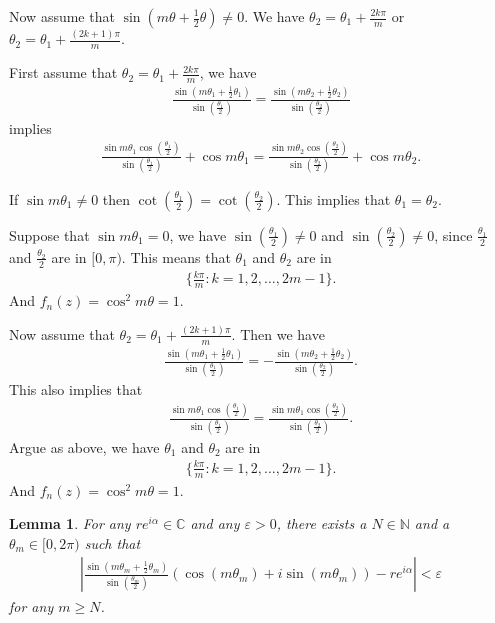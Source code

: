 \documentclass[a4paper,10pt]{amsart}
\newtheorem{lemma}{Lemma}[section]
\newcommand{\C}{\mathbb C} %
\newcommand{\N}{\mathbb N} %
\begin{document}
Now assume that $\sin (m\theta + \frac{1}{2}\theta) \neq 0$.
We have $\theta_2 = \theta_1 + \frac{2k\pi}{m}$ or
$\theta_2 = \theta_1 + \frac{(2k+1)\pi}{m}$.

First assume that $\theta_2 = \theta_1 + \frac{2k\pi}{m}$, we have
\begin{align*}
    \frac{\sin (m\theta_1 + \frac{1}{2}\theta_1)}
       {\sin (\frac{\theta_1}{2})} =
    \frac{\sin (m\theta_2 + \frac{1}{2}\theta_2)}
       {\sin (\frac{\theta_2}{2})}
\end{align*}
implies
\begin{align*}
    \frac{\sin m\theta_1 \cos (\frac{\theta_1}{2})}
    {\sin (\frac{\theta_1}{2})} + \cos m\theta_1  
    =
    \frac{\sin m\theta_2 \cos (\frac{\theta_2}{2})}
    {\sin (\frac{\theta_2}{2})} + \cos m\theta_2 . 
\end{align*}

If $\sin m\theta_1 \neq 0$ then $\cot (\frac{\theta_1}{2}) = 
\cot (\frac{\theta_2}{2})$. This implies that $\theta_1 = \theta_2$. 

Suppose that $\sin m\theta_1 = 0$, we have 
$\sin (\frac{\theta_1}{2}) \neq 0$ and $\sin (\frac{\theta_2}{2}) \neq 0$,
since $\frac{\theta_1}{2}$ and $\frac{\theta_2}{2}$ are in $[0, \pi)$.
This means that $\theta_1$ and $\theta_2$ are in 
\begin{align*}
    \{\frac{k\pi}{m} : k = 1, 2, \ldots, 2m-1 \}.
\end{align*}
And $f_n(z) = \cos^{2} m\theta = 1$.

Now assume that $\theta_2 = \theta_1 + \frac{(2k+1)\pi}{m}$. Then we have
\begin{align*}
    \frac{\sin (m\theta_1 + \frac{1}{2}\theta_1)}
       {\sin (\frac{\theta_1}{2})} =
    -\frac{\sin (m\theta_2 + \frac{1}{2}\theta_2)}
       {\sin (\frac{\theta_2}{2})}.
\end{align*}
This also implies that
\begin{align*}
    \frac{\sin m\theta_1 \cos (\frac{\theta_1}{2})}
    {\sin (\frac{\theta_1}{2})} 
    =
    \frac{\sin m\theta_1 \cos (\frac{\theta_2}{2})}
    {\sin (\frac{\theta_2}{2})}. 
\end{align*}
Argue as above, we have $\theta_1$ and $\theta_2$ are in 
\begin{align*}
    \{\frac{k\pi}{m} : k = 1, 2, \ldots, 2m-1 \}.
\end{align*}
And $f_n(z) = \cos^{2} m\theta = 1$.   

\begin{lemma}
    For any $re^{i\alpha} \in \C$ and any $\varepsilon > 0$, 
   there exists a $N \in \N$ and a $\theta_{m} \in [0, 2\pi)$
   such that
   \begin{align*}
      |\frac{\sin (m\theta_m + \frac{1}{2}\theta_m)}
       {\sin (\frac{\theta_m}{2})} \left (
   \cos (m\theta_m) + i\sin (m\theta_m) \right) - re^{i\alpha}| 
   < \varepsilon
   \end{align*}
   for any $m \geq N$.
\end{lemma}
\end{document}
